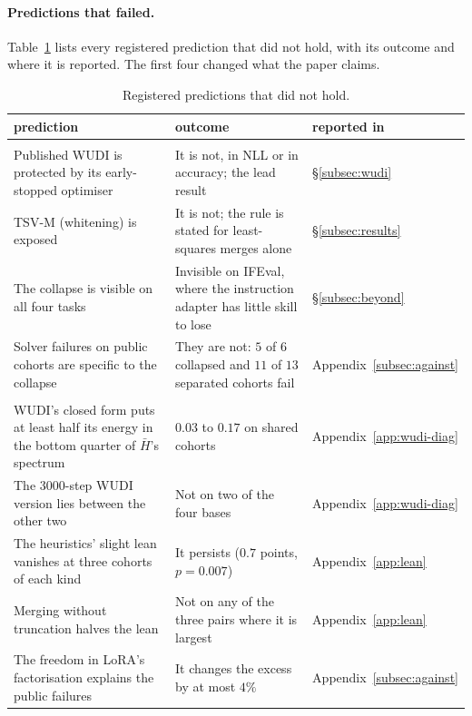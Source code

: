\paragraph{Predictions that failed.} Table~\ref{tab:failed} lists every
registered prediction that did not hold, with its outcome and where it is
reported. The first four changed what the paper claims.

\begin{table}[pos=htbp]
\centering
\small
\caption{Registered predictions that did not hold.}
\label{tab:failed}
\setlength{\tabcolsep}{3.5pt}
\begin{tabularx}{\textwidth}{>{\raggedright\arraybackslash}X
                >{\raggedright\arraybackslash}X
                >{\raggedright\arraybackslash}p{1.9cm}}
\toprule
prediction & outcome & reported in \\
\midrule
\multicolumn{3}{l}{\emph{Changed what the paper claims}} \\
Published WUDI is protected by its early-stopped optimiser & It is not, in NLL or in accuracy; the lead result & \S\ref{subsec:wudi} \\
TSV-M (whitening) is exposed & It is not; the rule is stated for least-squares merges alone & \S\ref{subsec:results} \\
The collapse is visible on all four tasks & Invisible on IFEval, where the instruction adapter has little skill to lose & \S\ref{subsec:beyond} \\
Solver failures on public cohorts are specific to the collapse & They are not: $5$ of $6$ collapsed and $11$ of $13$ separated cohorts fail & Appendix~\ref{subsec:against} \\
\addlinespace
\multicolumn{3}{l}{\emph{Explanations that did not survive}} \\
WUDI's closed form puts at least half its energy in the bottom quarter of $\bar H$'s spectrum & $0.03$ to $0.17$ on shared cohorts & Appendix~\ref{app:wudi-diag} \\
The 3000-step WUDI version lies between the other two & Not on two of the four bases & Appendix~\ref{app:wudi-diag} \\
The heuristics' slight lean vanishes at three cohorts of each kind & It persists ($0.7$ points, $p = 0.007$) & Appendix~\ref{app:lean} \\
Merging without truncation halves the lean & Not on any of the three pairs where it is largest & Appendix~\ref{app:lean} \\
The freedom in LoRA's factorisation explains the public failures & It changes the excess by at most $4\%$ & Appendix~\ref{subsec:against} \\

\end{tabularx}
\end{table}
